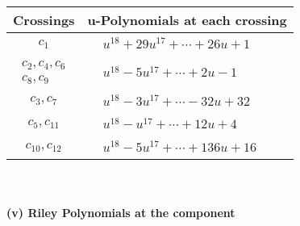\documentclass[1p]{elsarticle_modified}
\theoremstyle{definition}
\begin{document}
\begin{tabular}{m{50pt}|m{274pt}}
Crossings & \hspace{64pt}u-Polynomials at each crossing \\
\hline $$\begin{aligned}c_{1}\end{aligned}$$&$\begin{aligned}
&u^{18}+29 u^{17}+\cdots+26 u+1
\end{aligned}$\\
\hline $$\begin{aligned}c_{2},c_{4},c_{6}\\c_{8},c_{9}\end{aligned}$$&$\begin{aligned}
&u^{18}-5 u^{17}+\cdots+2 u-1
\end{aligned}$\\
\hline $$\begin{aligned}c_{3},c_{7}\end{aligned}$$&$\begin{aligned}
&u^{18}-3 u^{17}+\cdots-32 u+32
\end{aligned}$\\
\hline $$\begin{aligned}c_{5},c_{11}\end{aligned}$$&$\begin{aligned}
&u^{18}- u^{17}+\cdots+12 u+4
\end{aligned}$\\
\hline $$\begin{aligned}c_{10},c_{12}\end{aligned}$$&$\begin{aligned}
&u^{18}-5 u^{17}+\cdots+136 u+16
\end{aligned}$\\
\hline
\end{tabular}\\~\\
\newpage\renewcommand{\arraystretch}{1}
\flushleft \textbf{(v) Riley Polynomials at the component}\newline \\
\end{document}
